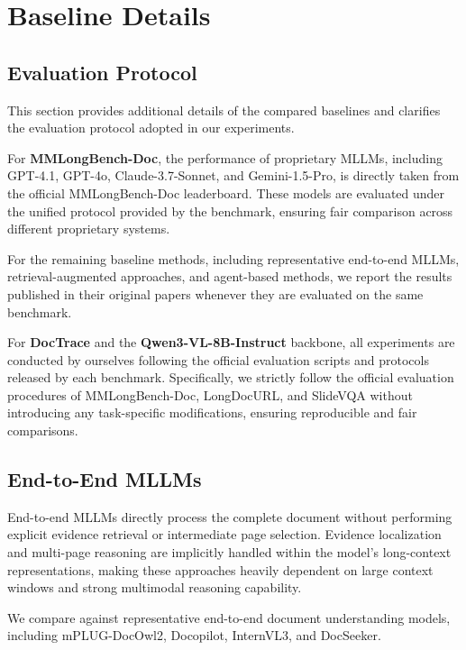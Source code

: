 \documentclass[letterpaper]{article} %
\begin{document}
\section{Baseline Details}

\subsection{Evaluation Protocol}

This section provides additional details of the compared baselines and clarifies the evaluation protocol adopted in our experiments.

For \textbf{MMLongBench-Doc}, the performance of proprietary MLLMs, including GPT-4.1, GPT-4o, Claude-3.7-Sonnet, and Gemini-1.5-Pro, is directly taken from the official MMLongBench-Doc leaderboard. These models are evaluated under the unified protocol provided by the benchmark, ensuring fair comparison across different proprietary systems.

For the remaining baseline methods, including representative end-to-end MLLMs, retrieval-augmented approaches, and agent-based methods, we report the results published in their original papers whenever they are evaluated on the same benchmark.

For \textbf{DocTrace} and the \textbf{Qwen3-VL-8B-Instruct} backbone, all experiments are conducted by ourselves following the official evaluation scripts and protocols released by each benchmark. Specifically, we strictly follow the official evaluation procedures of MMLongBench-Doc, LongDocURL, and SlideVQA without introducing any task-specific modifications, ensuring reproducible and fair comparisons.




\subsection{End-to-End MLLMs}

End-to-end MLLMs directly process the complete document without performing explicit evidence retrieval or intermediate page selection. Evidence localization and multi-page reasoning are implicitly handled within the model's long-context representations, making these approaches heavily dependent on large context windows and strong multimodal reasoning capability.

We compare against representative end-to-end document understanding models, including mPLUG-DocOwl2, Docopilot, InternVL3, and DocSeeker.
\end{document}
